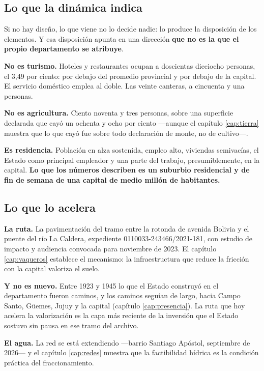 \subsection*{Lo que la dinámica indica}

Si no hay diseño, lo que viene no lo decide nadie: lo produce la disposición de los elementos.
Y esa disposición apunta en una dirección \textbf{que no es la que el propio departamento se
atribuye}.

\textbf{No es turismo.} Hoteles y restaurantes ocupan a doscientas dieciocho personas, el 3,49
por ciento: por debajo del promedio provincial y por debajo de la capital. El servicio doméstico
emplea al doble. Las veinte canteras, a cincuenta y una personas.

\textbf{No es agricultura.} Ciento noventa y tres personas, sobre una superficie declarada que
cayó un ochenta y ocho por ciento ---aunque el capítulo \ref{cap:tierra} muestra que lo que cayó
fue sobre todo declaración de monte, no de cultivo---.

\textbf{Es residencia.} Población en alza sostenida, empleo alto, viviendas semivacías, el Estado como principal empleador y una parte del trabajo, presumiblemente, en la capital. \textbf{Lo que los números describen es un suburbio residencial y de fin de semana de una
capital de medio millón de habitantes.}

\subsection*{Lo que lo acelera}

\textbf{La ruta.} La pavimentación del tramo entre la rotonda de avenida Bolivia y el puente del
río La Caldera, expediente 0110033-243466/2021-181, con estudio de impacto y audiencia convocada para noviembre de 2023. El capítulo \ref{cap:vaqueros} establece el mecanismo: la infraestructura que reduce
la fricción con la capital valoriza el suelo.

\textbf{Y no es nuevo.} Entre 1923 y 1945 lo que el Estado construyó en el departamento fueron
caminos, y los caminos seguían de largo, hacia Campo Santo, Güemes, Jujuy y la capital (capítulo
\ref{cap:presencia}). La ruta que hoy acelera la valorización es la capa más reciente de la
inversión que el Estado sostuvo sin pausa en ese tramo del archivo.

\textbf{El agua.} La red se está extendiendo ---barrio Santiago Apóstol, septiembre de 2026--- y
el capítulo \ref{cap:redes} muestra que la factibilidad hídrica es la condición práctica del
fraccionamiento.


